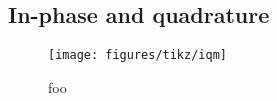 \subsection{In-phase and quadrature}

\begin{figure}[htb]
    \centering
    \texttt{[image: figures/tikz/iqm]}
    \caption{foo}\label{fig:iqm}
\end{figure}